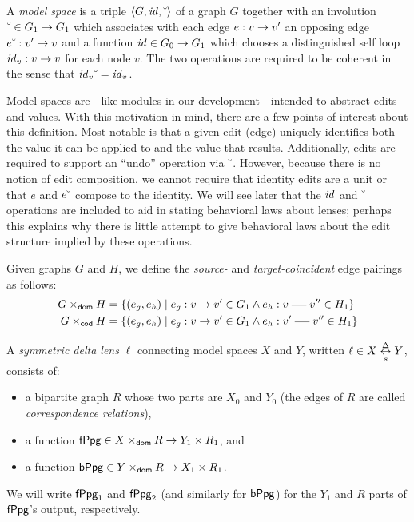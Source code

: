 \begin{definition}
    A \emph{model space} is a triple $\left<G,\mathit{id},\breve{\ }\right>$ of a
    graph $G$ together with an involution $\breve{\ }\in G_1 \to G_1$ which
    associates with each edge $e : v \to v'$ an opposing edge $e\breve{\ }:
    v' \to v$ and a function $\mathit{id} \in G_0 \to G_1$ which chooses a
    distinguished self loop $\mathit{id}_v : v \to v$ for each node $v$. The two
    operations are required to be coherent in the sense that $\mathit{id}_v\breve{\ } =
    \mathit{id}_v$.
\end{definition}

Model spaces are---like modules in our development---intended to abstract
edits and values. With this motivation in mind, there are a few points of
interest about this definition. Most notable is that a given edit (edge)
uniquely identifies both the value it can be applied to and the value that
results. Additionally, edits are required to support an ``undo'' operation
via $\breve{\ }$. However, because there is no notion of edit composition, we
cannot require that identity edits are a unit or that $e$ and $e\breve{\ }$
compose to the identity. We will see later that the $\mathit{id}$ and $\breve{\ }$
operations are included to aid in stating behavioral laws about lenses;
perhaps this explains why there is little attempt to give behavioral laws
about the edit structure implied by these operations.

\begin{definition}
    Given graphs $G$ and $H$, we define the \emph{source-} and
    \emph{target-coincident} edge pairings as follows:
    \begin{align*}
        G \domco H &= \{(e_g,e_h) \mid e_g : v \dedge v' \in G_1 \land e_h :
        v \uedge v'' \in H_1\} \\
        G \codco H &= \{(e_g,e_h) \mid e_g : v \dedge v' \in G_1 \land e_h :
        v' \uedge v'' \in H_1\}
    \end{align*}
\end{definition}

\begin{definition}
    A \emph{symmetric delta lens} $\ell$ connecting model spaces $X$ and
    $Y$, written $\ell \in X \underset{s}{\overset{\Delta}{\leftrightarrow}} Y$, consists of:
    \begin{itemize}
        \item a bipartite graph $R$ whose two parts are $X_0$ and $Y_0$ (the
            edges of $R$ are called \emph{correspondence relations}),
        \item a function $\mathsf{fPpg} \in X \times_{\mathsf{dom}} R \to Y_1 \times R_1$,
            and
        \item a function $\mathsf{bPpg} \in Y \times_{\mathsf{dom}} R \to X_1 \times R_1$.
    \end{itemize}
    We will write $\mathsf{fPpg}_1$ and $\mathsf{fPpg}_2$ (and similarly for $\mathsf{bPpg}$)
    for the $Y_1$ and $R$ parts of $\mathsf{fPpg}$'s output, respectively.
\end{definition}

